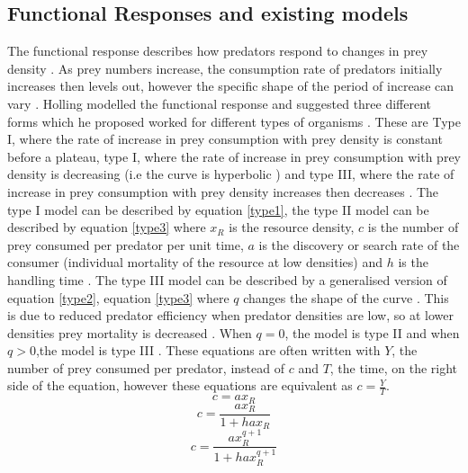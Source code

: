 \documentclass{article}
\begin{document}
\subsection{Functional Responses and existing models}
The functional response describes how predators respond to changes in prey density \cite{hollingsawfly1959,Solomon1949}. As prey numbers increase, the consumption rate of predators initially increases then levels out, however the specific shape of the period of increase can vary \cite{hollingsawfly1959}. Holling modelled the functional response and suggested three different forms which he proposed worked for different types of organisms \cite{hollingsawfly1959}. These are Type I, where the rate of increase in prey consumption with prey density is constant before a plateau, type I, where the rate of increase in prey consumption with prey density is decreasing (i.e the curve is hyperbolic \cite{Jeschke2002PredatorPrey}) and type III, where the  rate of increase in prey consumption with prey density increases then decreases \cite{hollingsawfly1959}. The type I model can be described by equation \ref{type1}, the type II model can be described by equation \ref{type3} where $x_R$ is the resource density, $c$ is the number of prey consumed per predator per unit time, $a$ is the discovery or search rate of the consumer (individual mortality of the resource at low densities\cite{Englund2011TemperatureResponse}) and $h$ is the handling time \cite{Dawes2013,Holling1959}. The type III model can be described by a generalised version of equation \ref{type2}, equation \ref{type3} where $q$ changes the shape of the curve \cite{Dawes2013}. This is due to reduced predator efficiency when predator densities are low, so at lower densities prey mortality is decreased \cite{Taylor2003EffectAmericanus,Hassell1978TheSystems.}. 
When $q=0$, the model is type II and when $q>0$,the model is type III \cite{Dawes2013}. These equations are often written with $Y$, the number of prey consumed per predator, instead of $c$ and $T$, the time, on the right side of the equation, however these equations are equivalent as $c=\frac{Y}{T}$.
\begin{equation}\label{type1}
    c=ax_R
\end{equation}
\begin{equation}\label{type2}
c=\frac{ax_R}{1+hax_R}
\end{equation}
\begin{equation}\label{type3}
c=\frac{ax_R^{q+1}}{1+hax_R^{q+1}}
\end{equation}
\end{document}
